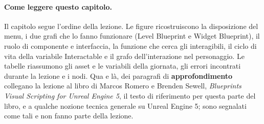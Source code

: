 \paragraph{Come leggere questo capitolo.} Il capitolo segue l'ordine della lezione. Le
figure ricostruiscono la disposizione del menu, i due grafi che lo fanno funzionare (Level
Blueprint e Widget Blueprint), il ruolo di componente e interfaccia, la funzione che
cerca gli interagibili, il ciclo di vita della variabile Interactable e il grafo
dell'interazione nel personaggio. Le tabelle riassumono gli asset e le variabili della
giornata, gli errori incontrati durante la lezione e i nodi. Qua e là, dei paragrafi di
\textbf{approfondimento} collegano la lezione al libro di Marcos Romero e Brenden Sewell,
\emph{Blueprints Visual Scripting for Unreal Engine 5}, il testo di riferimento per questa
parte del libro, e a qualche nozione tecnica generale su Unreal Engine 5; sono segnalati
come tali e non fanno parte della lezione.

